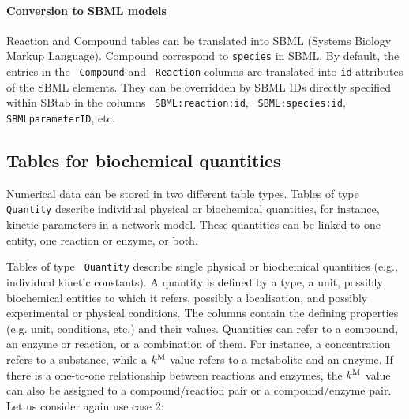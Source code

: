 \documentclass[a4paper]{article}
\newcommand{\la}[1]{}
\newcommand{\tab}[1]{{\texttt{\color{red} #1}}}
\newcommand{\col}[1]{\texttt{\color{blue} #1}}
\begin{document}
\paragraph{Conversion to SBML models} Reaction and Compound tables
can be translated into SBML (Systems Biology Markup Language).
Compound correspond to \texttt{species} in SBML. By default, the entries in
the \col{Compound} and \col{Reaction} columns are translated into \texttt{id}
attributes of the SBML elements. They can be overridden by SBML IDs
directly specified within SBtab in the columns \col{SBML:reaction:id},
\col{SBML:species:id}, \col{SBMLparameterID}, etc. 


\subsection{Tables for biochemical quantities}

Numerical data can be stored in two \la{four} different table types.
Tables of type \tab{Quantity} describe individual physical or
biochemical quantities, for instance, kinetic parameters in a network
model.  These quantities can be linked to one entity, one reaction or
enzyme, or both. 

Tables of type \tab{Quantity} describe single physical or biochemical
quantities (e.g., individual kinetic constants). 
A quantity is defined by a type, a unit, possibly
biochemical entities to which it refers, possibly a localisation, and
possibly experimental or physical conditions. The columns contain the
defining properties (e.g. unit, conditions, etc.)  and their values.
Quantities can refer to a compound, an enzyme or reaction, or a
combination of them. For instance, a concentration refers to a
substance, while a $k^{\rm M}$ value refers to a metabolite and an
enzyme. If there is a one-to-one relationship between reactions and
enzymes, the $k^{\rm M}$ value can also be assigned to a
compound/reaction pair or a compound/enzyme pair.  Let us consider
again use case 2:\\
\end{document}
